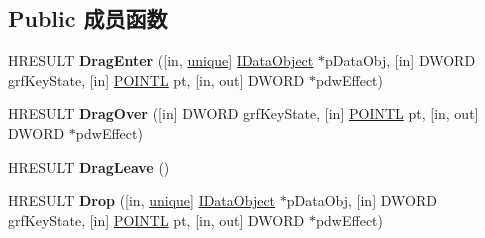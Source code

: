 \subsection*{Public 成员函数}
\begin{DoxyCompactItemize}
\item 
\mbox{\label{interface_i_drop_target_a9960bf447b1438d5c9945e4d972d0937}} 
H\+R\+E\+S\+U\+LT {\bfseries Drag\+Enter} (\mbox{[}in, \hyperlink{interfaceunique}{unique}\mbox{]} \hyperlink{interface_i_data_object}{I\+Data\+Object} $\ast$p\+Data\+Obj, \mbox{[}in\mbox{]} D\+W\+O\+RD grf\+Key\+State, \mbox{[}in\mbox{]} \hyperlink{struct___p_o_i_n_t_l}{P\+O\+I\+N\+TL} pt, \mbox{[}in, out\mbox{]} D\+W\+O\+RD $\ast$pdw\+Effect)
\item 
\mbox{\label{interface_i_drop_target_ad0e3472a7cb192960729592e7f3e8e61}} 
H\+R\+E\+S\+U\+LT {\bfseries Drag\+Over} (\mbox{[}in\mbox{]} D\+W\+O\+RD grf\+Key\+State, \mbox{[}in\mbox{]} \hyperlink{struct___p_o_i_n_t_l}{P\+O\+I\+N\+TL} pt, \mbox{[}in, out\mbox{]} D\+W\+O\+RD $\ast$pdw\+Effect)
\item 
\mbox{\label{interface_i_drop_target_a68d6de1a90f75b604785a2acea358afe}} 
H\+R\+E\+S\+U\+LT {\bfseries Drag\+Leave} ()
\item 
\mbox{\label{interface_i_drop_target_a5be3a3702b381cc11fdeb8d8a94c900d}} 
H\+R\+E\+S\+U\+LT {\bfseries Drop} (\mbox{[}in, \hyperlink{interfaceunique}{unique}\mbox{]} \hyperlink{interface_i_data_object}{I\+Data\+Object} $\ast$p\+Data\+Obj, \mbox{[}in\mbox{]} D\+W\+O\+RD grf\+Key\+State, \mbox{[}in\mbox{]} \hyperlink{struct___p_o_i_n_t_l}{P\+O\+I\+N\+TL} pt, \mbox{[}in, out\mbox{]} D\+W\+O\+RD $\ast$pdw\+Effect)
\end{DoxyCompactItemize}
